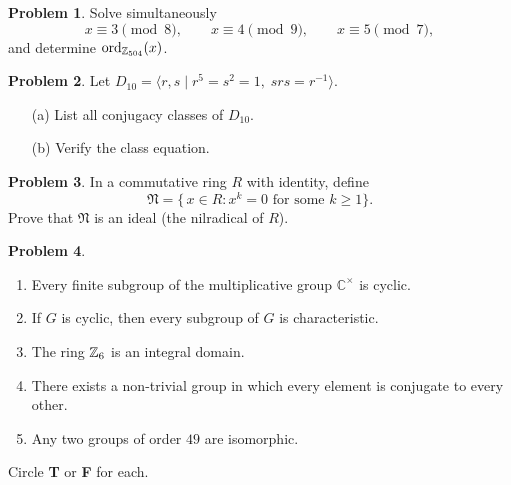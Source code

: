 \documentclass[12pt]{article}
\theoremstyle{definition} %
\newtheorem{problem}{Problem}
\theoremstyle{plain} %
\begin{document}
\bigskip
\begin{problem}
  Solve simultaneously
  \[
      x\equiv 3\pmod{8},\qquad
      x\equiv 4\pmod{9},\qquad
      x\equiv 5\pmod{7},
  \]
  and determine \(\operatorname{ord}_{\mathbb Z_{504}}(x)\).
\end{problem}

\bigskip
\begin{problem}
  Let \(D_{10}=\langle r,s\mid r^{5}=s^{2}=1,\;srs=r^{-1}\rangle\).
  \begin{enumerate}
      \item[(a)] List all conjugacy classes of \(D_{10}\).
      \item[(b)] Verify the class equation.
  \end{enumerate}
\end{problem}

\bigskip
\begin{problem}
  In a commutative ring \(R\) with identity, define
  \[
      \mathfrak N=\{\,x\in R:x^{k}=0\text{ for some }k\ge1\}.
  \]
  Prove that \(\mathfrak N\) is an ideal (the nilradical of \(R\)).
\end{problem}

\bigskip
\begin{problem}
  \begin{enumerate}[label=(\alph*)]
      \item Every finite subgroup of the multiplicative group \(\mathbb{C}^{\times}\)
            is cyclic.
      \item If \(G\) is cyclic, then every subgroup of \(G\) is characteristic.
      \item The ring \(\mathbb Z_{6}\) is an integral domain.
      \item There exists a non-trivial group in which every element is conjugate to every other.
      \item Any two groups of order \(49\) are isomorphic.
  \end{enumerate}
  Circle \textbf{T} or \textbf{F} for each.
\end{problem}
\end{document}
